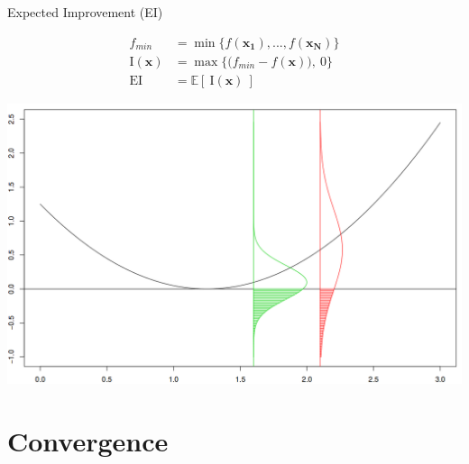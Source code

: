 \documentclass[ xcolor = pdftex, dvipsnames, table ]{beamer}
\def \Eix {
        \mathbb{E}\left[~\text{I}(\bm{x})~\right]
}
\def \ix {
        \text{I}(\bm{x})
}
\begin{document}
\begin{frame}{Expected Improvement (EI)}
\begin{minipage}[h!]{0.49\textwidth}
\begin{align*}
	f_{min} &= \min\Big\{ f(\bm{x_1}), ..., f(\bm{x_{N}}) \Big\}\\
        \ix &= \max \Big\{ \big(f_{min} - f(\bm{x})\big), ~0 \Big\}\\
        \text{EI} &= \Eix
\end{align*}
\end{minipage}
\begin{minipage}[h!]{0.49\textwidth}
\begin{center}
\includegraphics[width=\textwidth]{eiPic.png}
\end{center}
\end{minipage}
\end{frame}

%
%

\section{Convergence}
\end{document}
